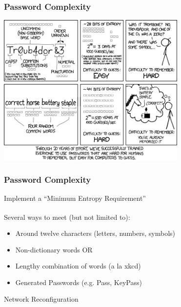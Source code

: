 \documentclass{beamer}
\begin{document}
\begin{frame}
  \frametitle{Password Complexity}
\centerline{\includegraphics[width=3.7in]{diagrams/password.png}}
\end{frame}



\begin{frame}
  \frametitle{Password Complexity}
Implement a ``Minimum Entropy Requirement'' \\ ~ \\
Several ways to meet (but not limited to):
    \begin{itemize}
      \item Around twelve characters (letters, numbers, symbols) 
      \item Non-dictionary words OR 
      \item Lengthy combination of words (a la xkcd)
      \item Generated Passwords (e.g. Pass, KeyPass) 
    \end{itemize}
\end{frame}

\begin{frame}
  \centerline{\huge{Network Reconfiguration}}
  
\end{frame}
\end{document}
